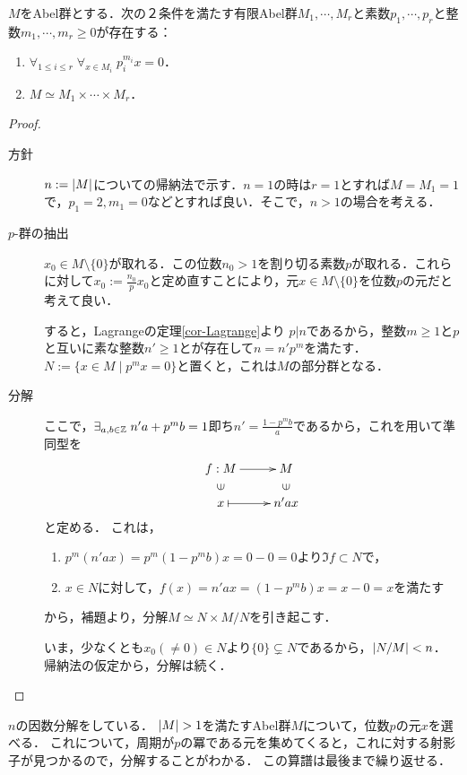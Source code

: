 \documentclass[uplatex,dvipdfmx]{jsreport}
\begin{document}
\begin{lemma}[$p$-群への分解]\label{lemma-decomposition-into-p-group}
    $M$をAbel群とする．次の２条件を満たす有限Abel群$M_1,\cdots,M_r$と素数$p_1,\cdots,p_r$と整数$m_1,\cdots,m_r\ge 0$が存在する：
    \begin{enumerate}
        \item $\forall_{1\le i\le r}\;\forall_{x\in M_i}\;p_i^{m_i}x=0$．
        \item $M\simeq M_1\times\cdots\times M_r$．
    \end{enumerate}
\end{lemma}
\begin{proof}\mbox{}
    \begin{description}
        \item[方針] $n:=\lvert M\rvert$についての帰納法で示す．$n=1$の時は$r=1$とすれば$M=M_1=1$で，$p_1=2,m_1=0$などとすれば良い．そこで，$n>1$の場合を考える．
        \item[$p$-群の抽出] $x_0\in M\setminus\{0\}$が取れる．この位数$n_0>1$を割り切る素数$p$が取れる．これらに対して$x_0:=\frac{n_0}{p}x_0$と定め直すことにより，元$x\in M\setminus\{0\}$を位数$p$の元だと考えて良い．
        
        すると，Lagrangeの定理\ref{cor-Lagrange}より
        $p|n$であるから，整数$m\ge 1$と$p$と互いに素な整数$n'\ge 1$とが存在して$n=n'p^m$を満たす．
        $N:=\{x\in M\mid p^mx=0\}$と置くと，これは$M$の部分群となる．
        \item[分解]
        ここで，$\exists_{a,b\in\mathbb{Z}}\;n'a+p^mb=1$即ち$n'=\frac{1-p^mb}{a}$であるから，これを用いて準同型を
        \[\xymatrix@R-2pc{
            f:M\ar[r]&M\\
            \rotatebox[origin=c]{90}{$\in$}&\rotatebox[origin=c]{90}{$\in$}\\
            x\ar@{|->}[r]&n'ax
        }\]
        と定める．
        これは，
        \begin{enumerate}
            \item $p^m(n'ax)=p^m(1-p^mb)x=0-0=0$より$\Im f\subset N$で，
            \item $x\in N$に対して，$f(x)=n'ax=(1-p^mb)x=x-0=x$を満たす
        \end{enumerate}
        から，補題より，分解$M\simeq N\times M/N$を引き起こす．
        
        いま，少なくとも$x_0(\ne 0)\in N$より$\{0\}\subsetneq N$であるから，$\lvert N/M\rvert<n$．
        帰納法の仮定から，分解は続く．
    \end{description}
\end{proof}
\begin{remarks}
    $n$の因数分解をしている．
    $\lvert M\rvert>1$を満たすAbel群$M$について，位数$p$の元$x$を選べる．
    これについて，周期が$p$の冪である元を集めてくると，これに対する射影子が見つかるので，分解することがわかる．
    この算譜は最後まで繰り返せる．
\end{remarks}
\end{document}
